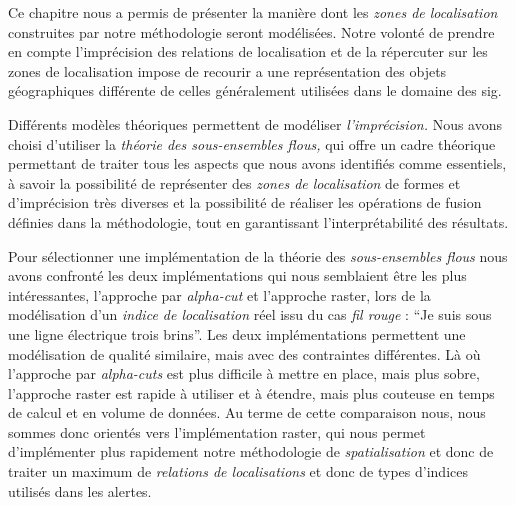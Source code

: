 Ce chapitre nous a permis de présenter la manière dont les \emph{zones
  de localisation} construites par notre méthodologie seront
modélisées. Notre volonté de prendre en compte l'imprécision des
relations de localisation et de la répercuter sur les zones de
localisation impose de recourir a une représentation des objets
géographiques différente de celles généralement utilisées dans le
domaine des \ac{sig}.

Différents modèles théoriques permettent de modéliser
\emph{l'imprécision.} Nous avons choisi d'utiliser la \emph{théorie
  des sous-ensembles flous,} qui offre un cadre théorique permettant
de traiter tous les aspects que nous avons identifiés comme
essentiels, à savoir la possibilité de représenter des \emph{zones de
  localisation} de formes et d'imprécision très diverses et la
possibilité de réaliser les opérations de fusion définies dans la
méthodologie, tout en garantissant l'interprétabilité des résultats.

Pour sélectionner une implémentation de la théorie des
\emph{sous-ensembles flous} nous avons confronté les deux
implémentations qui nous semblaient être les plus intéressantes,
l'approche par \emph{alpha-cut} et l'approche raster, lors de la
modélisation d'un \emph{indice de localisation} réel issu du cas
\emph{fil rouge} : \enquote{Je suis sous une ligne électrique trois
  brins}. Les deux implémentations permettent une modélisation de
qualité similaire, mais avec des contraintes différentes. Là où
l'approche par \emph{alpha-cuts} est plus difficile à mettre en place,
mais plus sobre, l'approche raster est rapide à utiliser et à étendre,
mais plus couteuse en temps de calcul et en volume de données. Au
terme de cette comparaison nous, nous sommes donc orientés vers
l'implémentation raster, qui nous permet d’implémenter plus rapidement
notre méthodologie de \emph{spatialisation} et donc de traiter un
maximum de \emph{relations de localisations} et donc de types
d'indices utilisés dans les alertes.


